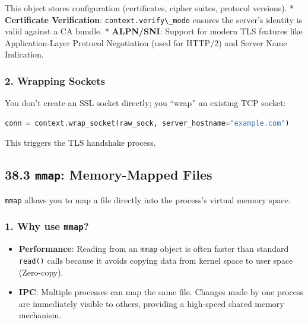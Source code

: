 This object stores configuration (certificates, cipher suites, protocol
versions). * \textbf{Certificate Verification}:
\passthrough{\lstinline!context.verify\_mode!} ensures the server's
identity is valid against a CA bundle. * \textbf{ALPN/SNI}: Support for
modern TLS features like Application-Layer Protocol Negotiation (used
for HTTP/2) and Server Name Indication.

\hypertarget{wrapping-sockets}{%
\subsubsection{2. Wrapping Sockets}\label{wrapping-sockets}}

You don't create an SSL socket directly; you ``wrap'' an existing TCP
socket:

\begin{lstlisting}[language=Python]
conn = context.wrap_socket(raw_sock, server_hostname="example.com")
\end{lstlisting}

This triggers the TLS handshake process.

\hypertarget{mmap-memory-mapped-files}{%
\subsection{\texorpdfstring{38.3 \texttt{mmap}: Memory-Mapped
Files}{38.3 mmap: Memory-Mapped Files}}\label{mmap-memory-mapped-files}}

\passthrough{\lstinline!mmap!} allows you to map a file directly into
the process's virtual memory space.

\hypertarget{why-use-mmap}{%
\subsubsection{\texorpdfstring{1. Why use
\texttt{mmap}?}{1. Why use mmap?}}\label{why-use-mmap}}

\begin{itemize}
\tightlist
\item
  \textbf{Performance}: Reading from an \passthrough{\lstinline!mmap!}
  object is often faster than standard \passthrough{\lstinline!read()!}
  calls because it avoids copying data from kernel space to user space
  (Zero-copy).
\item
  \textbf{IPC}: Multiple processes can map the same file. Changes made
  by one process are immediately visible to others, providing a
  high-speed shared memory mechanism.
\end{itemize}

